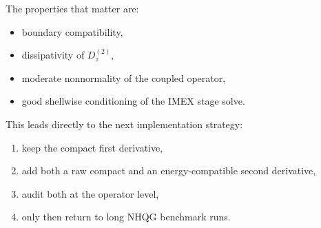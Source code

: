 \documentclass[11pt]{article}
\newcommand{\Dztwo}{D^{(2)}_z}
\begin{document}
The properties that matter are:
\begin{itemize}[nosep]
\item boundary compatibility,
\item dissipativity of $\Dztwo$,
\item moderate nonnormality of the coupled operator,
\item good shellwise conditioning of the IMEX stage solve.
\end{itemize}

This leads directly to the next implementation strategy:
\begin{enumerate}[nosep]
\item keep the compact first derivative,
\item add both a raw compact and an energy-compatible second derivative,
\item audit both at the operator level,
\item only then return to long NHQG benchmark runs.
\end{enumerate}
\end{document}
